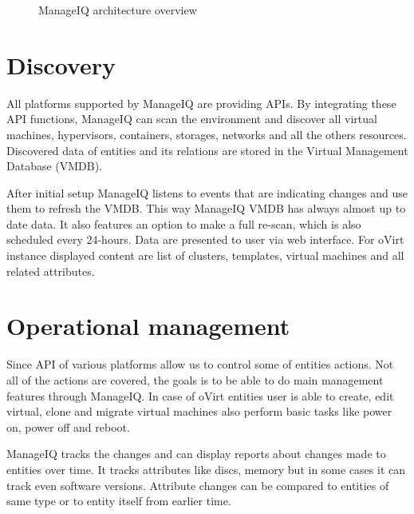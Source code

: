 \begin{figure}[h]
\caption{ManageIQ architecture overview \cite{manageIQimg}}
\label{miq_architecture}
\end{figure}

\section{Discovery}
All platforms supported by ManageIQ are providing APIs. By integrating these API functions, ManageIQ can scan the environment and discover all virtual machines, hypervisors, containers, storages, networks and all the others resources. Discovered data of entities and its relations are stored in the Virtual Management Database (VMDB). 

After initial setup ManageIQ listens to events that are indicating changes and use them to refresh the VMDB. This way ManageIQ VMDB has always almost up to date data. It also features an option to make a full re-scan, which is also scheduled every 24-hours.
Data are presented to user via web interface. For oVirt instance displayed content are list of clusters, templates, virtual machines and all related attributes.

\section{Operational management}
Since API of various platforms allow us to control some of entities actions. Not all of the actions are covered, the goals is to be able to do main management features through ManageIQ. 
In case of oVirt entities user is able to create, edit virtual, clone and migrate virtual machines also perform basic tasks like power on, power off and reboot.

ManageIQ tracks the changes and can display reports about changes made to entities over time. It tracks attributes like discs, memory but in some cases it can track even software versions. Attribute changes can be compared to entities of same type or to entity itself from earlier time.

